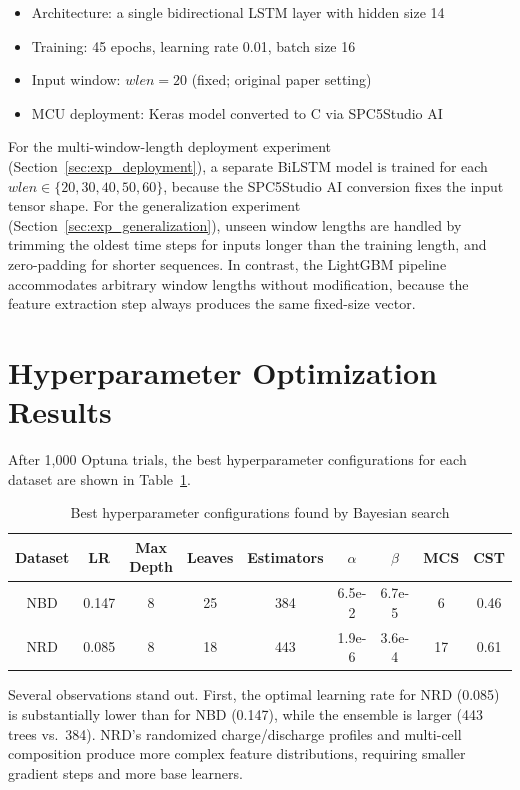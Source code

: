 \begin{itemize}
    \item Architecture: a single bidirectional LSTM layer with hidden size 14
    \item Training: 45 epochs, learning rate 0.01, batch size 16
    \item Input window: $wlen = 20$ (fixed; original paper setting)
    \item MCU deployment: Keras model converted to C via SPC5Studio AI
\end{itemize}

For the multi-window-length deployment experiment (Section~\ref{sec:exp_deployment}), a separate BiLSTM model is trained for each $wlen \in \{20, 30, 40, 50, 60\}$, because the SPC5Studio AI conversion fixes the input tensor shape. For the generalization experiment (Section~\ref{sec:exp_generalization}), unseen window lengths are handled by trimming the oldest time steps for inputs longer than the training length, and zero-padding for shorter sequences. In contrast, the LightGBM pipeline accommodates arbitrary window lengths without modification, because the feature extraction step always produces the same fixed-size vector.


\section{Hyperparameter Optimization Results}
\label{sec:exp_hp}

After 1{,}000 Optuna trials, the best hyperparameter configurations for each dataset are shown in Table~\ref{tab:best_hp}.

\begin{table}[H]
    \centering
    \setcellgapes{3pt}
    \makegapedcells
    \begin{tabular}{c c c c c c c c c}
    \hline
    Dataset & LR & \makecell{Max \\ Depth} & Leaves & Estimators & $\alpha$ & $\beta$ & MCS & CST \\
    \hline
    NBD & 0.147 & 8 & 25 & 384 & 6.5e-2 & 6.7e-5 & 6 & 0.46 \\
    NRD & 0.085 & 8 & 18 & 443 & 1.9e-6 & 3.6e-4 & 17 & 0.61 \\
    \hline
    \end{tabular}
    \caption{Best hyperparameter configurations found by Bayesian search}
    \label{tab:best_hp}
\end{table}

Several observations stand out. First, the optimal learning rate for NRD (0.085) is substantially lower than for NBD (0.147), while the ensemble is larger (443 trees vs.\ 384). NRD's randomized charge/discharge profiles and multi-cell composition produce more complex feature distributions, requiring smaller gradient steps and more base learners.

